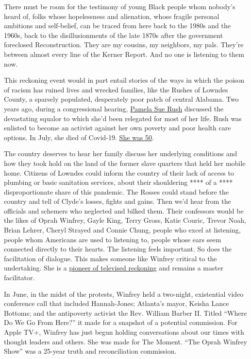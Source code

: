 There must be room for the testimony of young Black people whom nobody's
heard of, folks whose hopelessness and alienation, whose fragile
personal ambitions and self-belief, can be traced from here back to the
1980s and the 1960s, back to the disillusionments of the late 1870s
after the government foreclosed Reconstruction. They are my cousins, my
neighbors, my pals. They're between almost every line of the Kerner
Report. And no one is listening to them now.

This reckoning event would in part entail stories of the ways in which
the poison of racism has ruined lives and wrecked families, like the
Rushes of Lowndes County, a sparsely populated, desperately poor patch
of central Alabama. Two years ago, during a congressional hearing,
\href{https://www.facingsouth.org/2020/07/remembering-pamela-sue-rush-death-caused-structural-poverty}{Pamela
Sue Rush} discussed the devastating squalor to which she'd been
relegated for most of her life. Rush was enlisted to become an activist
against her own poverty and poor health care options. In July, she died
of Covid-19.
\href{https://www.pbs.org/newshour/show/in-alabama-racial-disparities-in-health-outcomes-predate-the-pandemic}{She
was 50}.

The country deserves to hear her family discuss her underlying
conditions and how they took hold on the land of the former slave
quarters that held her mobile home. Citizens of Lowndes could inform the
country of their lack of access to plumbing or basic sanitation
services, about their shouldering **** of a **** disproportionate share
of this pandemic. The Rosses could stand before the country and tell of
Clyde's losses, fights and gains. Then we'd hear from the officials and
schemers who neglected and bilked them. Their confessors would be the
likes of Oprah Winfrey, Gayle King, Terry Gross, Katie Couric, Trevor
Noah, Brian Lehrer, Cheryl Strayed and Connie Chung, people who excel at
listening, people whom Americans are used to listening to, people whose
ears seem connected directly to their hearts. The listening feels
important. So does the facilitation of dialogue. This makes someone like
Winfrey critical to the undertaking. She is a
\href{https://www.nytimes3xbfgragh.onion/2018/06/21/arts/design/oprah-winfrey-smithsonian-national-museum-of-african-american-history-and-culture.html}{pioneer
of televised reckoning} and remains a master facilitator.

In June, in the midst of the protests, Winfrey held a two-night,
existential video conference call that included Hannah-Jones; Atlanta's
mayor, Keisha Lance Bottoms; and the antipoverty activist the Rev.
William Barber II. Titled ``Where Do We Go From Here?'' it made for a
snapshot of a potential commission. For Apple TV+, Winfrey has just
begun holding conversations about our times with thought leaders and
others. She was made for The Moment. ``The Oprah Winfrey Show'' was a
25-year truth and reconciliation commission.

